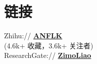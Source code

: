 \documentclass[]{deedy-resume-openfont}
\begin{document}
\begin{minipage}[t]{0.25\textwidth}

    \section{链接}
    \sectionsep
    Zhihu://  \href{https://www.zhihu.com/people/lzmo}{\bf ANFLK} \\
    (4.6k+ 收藏，3.6k+ 关注者) \\
    ResearchGate:// \href{https://www.researchgate.net/profile/Zimo_Liao}{\bf ZimoLiao} \\
    \sectionsep


\end{minipage}
\hfill
\end{document}

